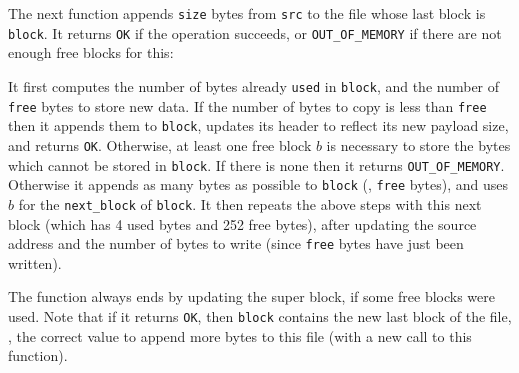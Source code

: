 The next function appends {\tt size} bytes from {\tt src} to the file whose
last block is {\tt *block}. It returns {\tt OK} if the operation succeeds, or
{\tt OUT\_OF\_MEMORY} if there are not enough free blocks for this:


It first computes the number of bytes already {\tt used} in {\tt *block}, and
the number of {\tt free} bytes to store new data. If the number of bytes to
copy is less than {\tt free} then it appends them to {\tt *block}, updates its
header to reflect its new payload size, and returns {\tt OK}. Otherwise, at
least one free block $b$ is necessary to store the bytes which cannot be stored
in {\tt *block}. If there is none then it returns {\tt OUT\_OF\_MEMORY}.
Otherwise it appends as many bytes as possible to {\tt *block} (\ie, {\tt free}
bytes), and uses $b$ for the {\tt next\_block} of {\tt *block}. It then repeats
the above steps with this next block (which has 4 used bytes and 252 free
bytes), after updating the source address and the number of bytes to write
(since {\tt free} bytes have just been written).

The function always ends by updating the super block, if some free blocks were
used. Note that if it returns {\tt OK}, then {\tt *block} contains the new last
block of the file, \ie, the correct value to append more bytes to this file
(with a new call to this function).

